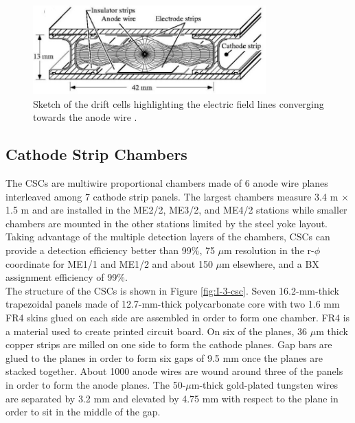       \begin{figure}[b!]
        \centering
        \includegraphics[width=0.8\textwidth]{img/I-3-cms/dt.jpg}
        \caption{Sketch of the drift cells highlighting the electric field lines converging towards the anode wire \cite{1748-0221-3-08-S08004}.}
        \label{fig:I-3-dt}
      \end{figure}

  	\subsection{Cathode Strip Chambers}

      The CSCs are multiwire proportional chambers made of 6 anode wire planes interleaved among 7 cathode strip panels. The largest chambers measure 3.4 m $ \times $ 1.5 m and are installed in the ME2/2, ME3/2, and ME4/2 stations while smaller chambers are mounted in the other stations limited by the steel yoke layout. Taking advantage of the multiple detection layers of the chambers, CSCs can provide a detection efficiency better than 99\%, 75 $\mu$m resolution in the r-$\phi$ coordinate for ME1/1 and ME1/2 and about 150 $\mu$m elsewhere, and a BX assignment efficiency of 99\%. \\

      The structure of the CSCs is shown in Figure \ref{fig:I-3-csc}. Seven 16.2-mm-thick trapezoidal panels made of 12.7-mm-thick polycarbonate core with two 1.6 mm FR4 skins glued on each side are assembled in order to form one chamber. FR4 is a material used to create printed circuit board. On six of the planes, 36 $\mu$m thick copper strips are milled on one side to form the cathode planes. Gap bars are glued to the planes in order to form six gaps of 9.5 mm once the planes are stacked together. About 1000 anode wires are wound around three of the panels in order to form the anode planes. The 50-$\mu$m-thick gold-plated tungsten wires are separated by 3.2 mm and elevated by 4.75 mm with respect to the plane in order to sit in the middle of the gap.

